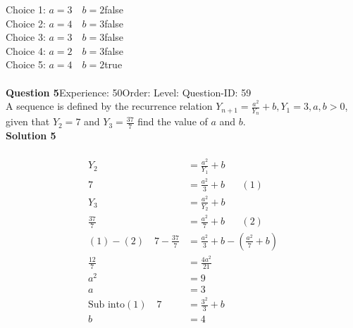 \documentclass{article}
\begin{document}
Choice 1: \hspace{20pt}$a=3\quad b=2$\hspace{20pt}false\\
Choice 2: \hspace{20pt}$a=4\quad b=3$\hspace{20pt}false\\
Choice 3: \hspace{20pt}$a=3\quad b=3$\hspace{20pt}false\\
Choice 4: \hspace{20pt}$a=2\quad b=3$\hspace{20pt}false\\
Choice 5: \hspace{20pt}$a=4\quad b=2$\hspace{20pt}true\\
\\[4pt]
\noindent\textbf{Question 5}\hspace{20pt}Experience: 50\hspace{20pt}Order: \hspace{20pt}Level: \hspace{20pt}Question-ID: 59\\[2pt]
A sequence is defined by the recurrence relation $Y_{n+1}=\displaystyle\frac{a^2}{Y_n}+b, Y_1=3, a,b>0$, given that $Y_2=7$ and $Y_3=\displaystyle\frac{37}{7}$ find the value of $a$ and $b$.\\[4pt]
\noindent\textbf{Solution 5}\\[2pt]
\\[-35pt]\begin{align*}
Y_2&=\displaystyle\frac{a^2}{Y_1}+b\\[2pt]
7&=\displaystyle\frac{a^2}{3}+b\hspace{20pt}(1)\\[12pt]
Y_3&=\displaystyle\frac{a^2}{Y_2}+b\\[2pt]
\displaystyle\frac{37}{7}&=\displaystyle\frac{a^2}{7}+b\hspace{20pt}(2)\\[2pt]
(1)-(2)\quad 7-\displaystyle\frac{37}{7}&=\frac{a^2}{3}+b-\left(\frac{a^2}{7}+b\right)\\[2pt]
\displaystyle\frac{12}{7}&=\displaystyle\frac{4a^2}{21}\\[2pt]
a^2&=9\\[2pt]
a&=3\\[12pt]
\text{Sub into} (1)\quad 7&=\displaystyle\frac{3^2}{3}+b\\[2pt]
b&=4
\end{align*}
\end{document}
